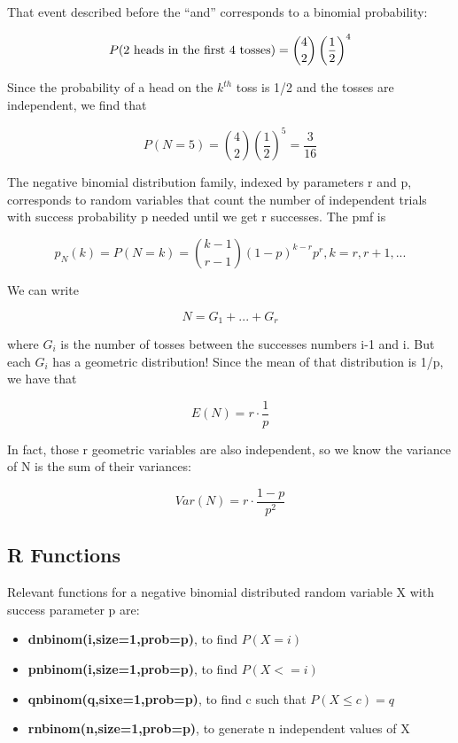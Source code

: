 That event described before the ``and'' corresponds to a binomial
probability:

\begin{equation}
P(2 {\rm ~heads~in~the~first~4~tosses}) = \binom{4}{2}
\left (\frac{1}{2} \right )^{4}
\end{equation}

Since the probability of a head on the $k^{th}$ toss is 1/2 and the
tosses are independent, we find that

\begin{equation}
P(N = 5) =  \binom{4}{2} \left (\frac{1}{2} \right )^5 = \frac{3}{16}
\end{equation}

The negative binomial distribution family, indexed by parameters r and
p, corresponds to random variables that count the number of independent
trials with success probability p needed until we get r successes.  The
pmf is

\begin{equation}
\label{negbinpmf}
p_N(k) = P(N = k) =  \binom{k-1}{r-1} (1-p)^{k-r} p^r, k = r, r+1, ...
\end{equation}

We can write

\begin{equation}
N = G_1+...+G_r
\end{equation}

where $G_i$ is the number of tosses between the successes numbers i-1
and i.  But each $G_i$ has a geometric distribution!  Since the mean of
that distribution is 1/p, we have that

\begin{equation}
\label{meannegbin}
E(N) = r \cdot \frac{1}{p}
\end{equation}

In fact, those r geometric variables are also independent, so we know
the variance of N is the sum of their variances:

\begin{equation}
Var(N) = r \cdot \frac{1-p}{p^2}
\end{equation} 

\subsection{R Functions}

Relevant functions for a negative binomial distributed random variable X
with success parameter p are:

\begin{itemize}

\item {\bf dnbinom(i,size=1,prob=p)}, to find $P(X = i)$

\item {\bf pnbinom(i,size=1,prob=p)}, to find $P(X <= i)$

\item {\bf qnbinom(q,sixe=1,prob=p)}, to find c such that $P(X \leq c) = q$

\item {\bf rnbinom(n,size=1,prob=p)}, to generate n independent values of X

\end{itemize}

